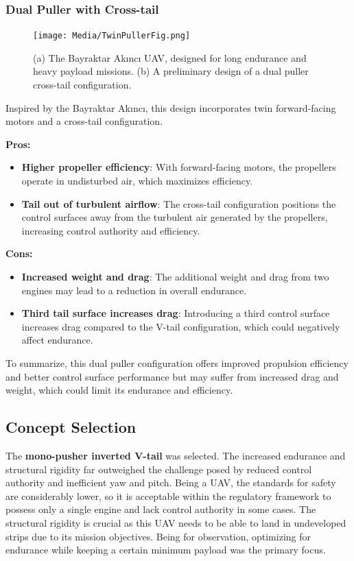 \documentclass[12pt]{article}
\begin{document}
	\newpage
	
	\subsubsection{Dual Puller with Cross-tail}
	\begin{figure}[h!]
		\centering
		\texttt{[image: Media/TwinPullerFig.png]} %
		\caption{(a) The Bayraktar Akıncı UAV, designed for long endurance and heavy payload missions. (b) A preliminary design of a dual puller cross-tail configuration.}
		\label{fig:dual_puller}
	\end{figure}
	Inspired by the Bayraktar Akıncı, this design incorporates twin forward-facing motors and a cross-tail configuration.
	
	\textbf{Pros:}
	\begin{itemize}
		\item \textbf{Higher propeller efficiency}: With forward-facing motors, the propellers operate in undisturbed air, which maximizes efficiency. 
		\item \textbf{Tail out of turbulent airflow}: The cross-tail configuration positions the control surfaces away from the turbulent air generated by the propellers, increasing control authority and efficiency. 
	\end{itemize}
	
	\textbf{Cons:}
	\begin{itemize}
		\item \textbf{Increased weight and drag}: The additional weight and drag from two engines may lead to a reduction in overall endurance.
		\item \textbf{Third tail surface increases drag}: Introducing a third control surface increases drag compared to the V-tail configuration, which could negatively affect endurance.
	\end{itemize}
	
	To summarize, this dual puller configuration offers improved propulsion efficiency and better control surface performance but may suffer from increased drag and weight, which could limit its endurance and efficiency.
	
	\newpage
	
	\subsection{Concept Selection}
	The \textbf{mono-pusher inverted V-tail} was selected. The increased endurance and structural rigidity far outweighed the challenge posed by reduced control authority and inefficient yaw and pitch. Being a UAV, the standards for safety are considerably lower, so it is acceptable within the regulatory framework to possess only a single engine and lack control authority in some cases. The structural rigidity is crucial as this UAV needs to be able to land in undeveloped strips due to its mission objectives. Being for observation, optimizing for endurance while keeping a certain minimum payload was the primary focus. 
	
\end{document}
